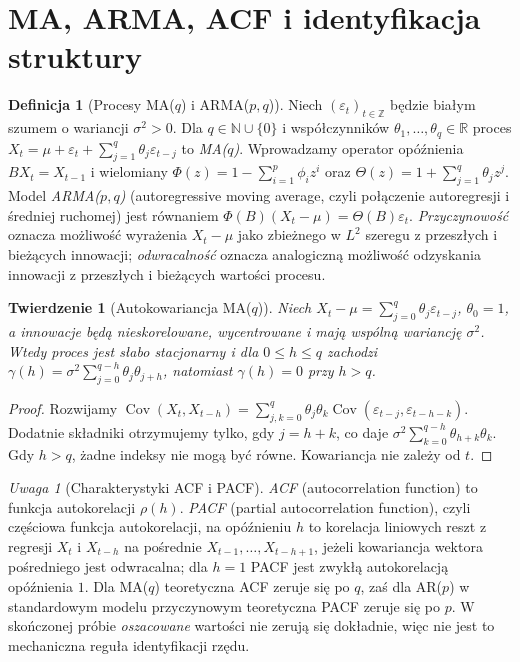 \documentclass[11pt,a4paper,oneside]{report}
\numberwithin{equation}{chapter}
\theoremstyle{plain}
\newtheorem{twierdzenie}{Twierdzenie}[chapter]
\theoremstyle{definition}
\newtheorem{definicja}{Definicja}[chapter]
\theoremstyle{remark}
\newtheorem{uwaga}{Uwaga}[chapter]
\newcommand{\R}{\mathbb R}
\newcommand{\N}{\mathbb N}
\newcommand{\Cov}{\operatorname{Cov}}
\begin{document}
\section{MA, ARMA, ACF i identyfikacja struktury}
\begin{definicja}[Procesy MA($q$) i ARMA($p,q$)]
Niech $(\varepsilon_t)_{t\in\mathbb Z}$ będzie
białym szumem o wariancji $\sigma^2>0$.
Dla $q\in\N\cup\{0\}$ i współczynników
$\theta_1,\ldots,\theta_q\in\R$ proces
$X_t=\mu+\varepsilon_t+
\sum_{j=1}^q\theta_j\varepsilon_{t-j}$
to \emph{MA($q$)}. Wprowadzamy operator opóźnienia
$BX_t=X_{t-1}$ i wielomiany
$\Phi(z)=1-\sum_{i=1}^p\phi_i z^i$ oraz
$\Theta(z)=1+\sum_{j=1}^q\theta_j z^j$.
Model \emph{ARMA($p,q$)} (autoregressive moving average,
czyli połączenie autoregresji i średniej ruchomej) jest równaniem
$\Phi(B)(X_t-\mu)=\Theta(B)\varepsilon_t$.
\emph{Przyczynowość} oznacza możliwość wyrażenia
$X_t-\mu$ jako zbieżnego w $L^2$ szeregu
z przeszłych i bieżących innowacji; \emph{odwracalność}
oznacza analogiczną możliwość odzyskania innowacji
z przeszłych i bieżących wartości procesu.
\end{definicja}

\begin{twierdzenie}[Autokowariancja MA($q$)]
\label{thm:maq-cov}
Niech $X_t-\mu=\sum_{j=0}^q\theta_j\varepsilon_{t-j}$,
$\theta_0=1$, a innowacje będą nieskorelowane,
wycentrowane i mają wspólną wariancję $\sigma^2$.
Wtedy proces jest słabo stacjonarny i dla
$0\le h\le q$ zachodzi
$\gamma(h)=\sigma^2\sum_{j=0}^{q-h}\theta_j\theta_{j+h}$,
natomiast $\gamma(h)=0$ przy $h>q$.
\end{twierdzenie}
\begin{proof}
Rozwijamy
$\Cov(X_t,X_{t-h})=\sum_{j,k=0}^q
\theta_j\theta_k\Cov(\varepsilon_{t-j},\varepsilon_{t-h-k})$.
Dodatnie składniki otrzymujemy tylko, gdy
$j=h+k$, co daje $\sigma^2\sum_{k=0}^{q-h}
\theta_{h+k}\theta_k$. Gdy $h>q$, żadne indeksy
nie mogą być równe. Kowariancja nie zależy od $t$.
\end{proof}

\begin{uwaga}[Charakterystyki ACF i PACF]
\emph{ACF} (autocorrelation function) to funkcja autokorelacji
$\rho(h)$. \emph{PACF} (partial autocorrelation function),
czyli częściowa funkcja autokorelacji, na opóźnieniu $h$
to korelacja liniowych
reszt z regresji $X_t$ i $X_{t-h}$ na pośrednie
$X_{t-1},\ldots,X_{t-h+1}$, jeżeli kowariancja
wektora pośredniego jest odwracalna; dla $h=1$
PACF jest zwykłą autokorelacją opóźnienia $1$.
Dla MA($q$) teoretyczna ACF zeruje się po $q$,
zaś dla AR($p$) w standardowym modelu przyczynowym
teoretyczna PACF zeruje się po $p$. W skończonej
próbie \emph{oszacowane} wartości nie zerują się dokładnie,
więc nie jest to mechaniczna reguła identyfikacji rzędu.
\end{uwaga}
\end{document}
